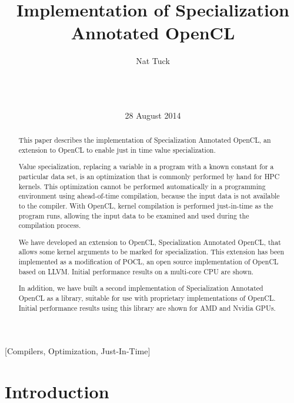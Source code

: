 \documentclass{acm_proc_article-sp}
\begin{document}
\title{Implementation of Specialization Annotated OpenCL}

\author{
\alignauthor
Nat Tuck\\
       \\
       \\
       \\
}

\date{28 August 2014}

\maketitle

\begin{abstract}
This paper describes the implementation of Specialization Annotated OpenCL, an
extension to OpenCL to enable just in time value specialization. 

Value specialization, replacing a variable in a program with a known constant
for a particular data set, is an optimization that is commonly performed by
hand for HPC kernels. This optimization cannot be performed automatically in a
programming environment using ahead-of-time compilation, because the input data
is not available to the compiler. With OpenCL, kernel compilation is performed
just-in-time as the program runs, allowing the input data to be examined and
used during the compilation process.

We have developed an extension to OpenCL, Specialization Annotated OpenCL, that
allows some kernel arguments to be marked for specialization. This extension
has been implemented as a modification of POCL, an open source implementation
of OpenCL based on LLVM. Initial performance results on a multi-core CPU are
shown.

In addition, we have built a second implementation of Specialization Annotated
OpenCL as a library, suitable for use with proprietary implementations of OpenCL.
Initial performance results using this library are shown for AMD and Nvidia GPUs.
\end{abstract}

[Compilers, Optimization, Just-In-Time]


\section{Introduction}
\end{document}
